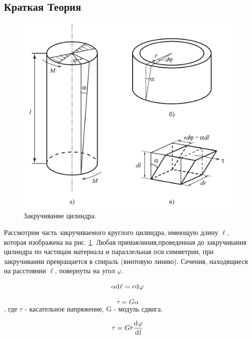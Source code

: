 \documentclass[a4paper,12pt]{article}
\numberwithin{equation}{section}
\begin{document}
\subsection{Краткая Теория}

\begin{figure} [H] \center
  \includegraphics[scale = 0.5]{data/2 pic 1.png}
  \caption{Закручивание цилиндра. \label{pic:3}}
\end{figure}

Рассмотрим часть закручиваемого круглого цилиндра, имеющую длину $\ell$, которая изображена на рис. \ref{pic:3}. Любая прямаялиния,проведенная до закручивания цилиндра по частицам материала и параллельная оси симметрии, при закручивании превращается в спираль (винтовую линию). Сечения, находящиеся на расстоянии $\ell$, повернуты на угол $\varphi$.



\begin{equation}
  \alpha \d{\ell} = r \d{\varphi} {\label{eq:2.1}}
\end{equation}

\begin{equation}
  \tau = G \alpha \label{eq:2.2}
\end{equation}
, где $\tau$ - касательное напряжение, G - модуль сдвига.

\begin{equation}
  \tau = G r \deriv{\varphi}{l} \label{eq:2.3}
\end{equation}
\end{document}

